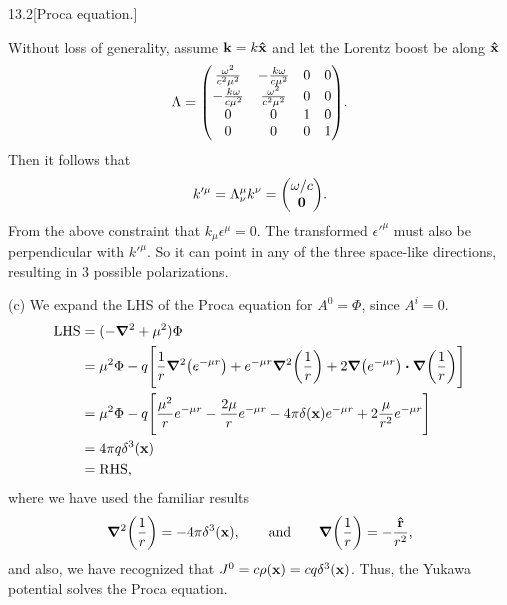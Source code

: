\documentclass[12pt]{article}
\begin{document}
\begin{problem}{13.2}[Proca equation.]
\begin{solution}
Without loss of generality, assume $\vb{k}=k\vb{\hat{x}}$ and let the Lorentz boost
be along $\vb{\hat{x}}$
\begin{equation}
    \Lambda=\mqty(\frac{\omega^2}{c^2\mu^2}&-\frac{k\omega}{c\mu^2}&0&0\\
    -\frac{k\omega}{c\mu^2}&\frac{\omega^2}{c^2\mu^2}&0&0\\
    0&0&1&0\\
    0&0&0&1).
\end{equation}
Then it follows that
\begin{equation}
    k'^\mu
    =\Lambda_\nu^\mu k^\nu=\mqty(\omega/c\\\vb{0}).
\end{equation}
From the above constraint that $k_\mu\epsilon^\mu=0$. The transformed
$\epsilon'^\mu$ must also be perpendicular with $k'^\mu$. So it can point in any
of the three space-like directions, resulting in 3 possible polarizations.

(c) We expand the LHS of the Proca equation for $A^0=\Phi$, since 
$A^i=0$.
\begin{align}
    \t{LHS}&=(-\grad^2+\mu^2)\Phi \notag\\
           &=\mu^2\Phi-q\qty[\frac1r\grad^2\qty(e^{-\mu r})+e^{-\mu
           r}\grad^2\qty(\frac1r)+2\grad\qty(e^{-\mu r})\vdot\grad\qty(\frac1r)]
           \notag\\
           &=\mu^2\Phi-q\qty[\frac{\mu^2}{r}e^{-\mu r}-\frac{2\mu}{r}e^{-\mu
           r}-4\pi\delta(\vb{x})e^{-\mu r}+2\frac{\mu}{r^2}e^{-\mu r}]\notag\\
           &=4\pi q\delta^3(\vb{x})\notag\\
           &=\t{RHS},
\end{align}
where we have used the familiar results
\begin{equation}
    \grad^2\qty(\frac1r)=-4\pi\delta^3(\vb{x}),\qquad\text{and}\qquad
    \grad\qty(\frac1r)=-\frac{\vb{\hat{r}}}{r^2},
\end{equation}
and also, we have recognized that $J^0=c\rho(\vb{x})=cq\delta^3(\vb{x})$. Thus,
the Yukawa potential solves the Proca equation.
\end{solution}
\end{problem}
\newpage
\end{document}

